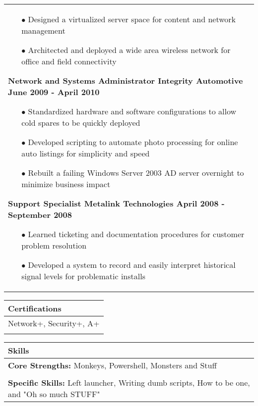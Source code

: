 \documentclass{article}
\begin{document}
\begin{tabular}{p{\dimexpr\linewidth-2\tabcolsep}}
 \begin{itemize}
	\item[$\bullet$]Designed a virtualized server space for content and network management
	\item[$\bullet$]Architected and deployed a wide area wireless network for office and field connectivity
  \end{itemize}
  {\bfseries Network and Systems Administrator \qquad Integrity Automotive \hfill June 2009 - April 2010}
 \begin{itemize}
	\item[$\bullet$]Standardized hardware and software configurations to allow cold spares to be quickly deployed
	\item[$\bullet$]Developed scripting to automate photo processing for online auto listings for simplicity and speed
	\item[$\bullet$]Rebuilt a failing Windows Server 2003 AD server overnight to minimize business impact
 \end{itemize}
   {\bfseries Support Specialist \hfill Metalink Technologies \quad \qquad April 2008 - September 2008}
 \begin{itemize}
 	\item[$\bullet$]Learned ticketing and documentation procedures for customer problem resolution
 	\item[$\bullet$]Developed a system to record and easily interpret historical signal levels for problematic installs
 \end{itemize}
\end{tabular}
\begin{tabular}{p{\dimexpr\linewidth-2\tabcolsep}}
	\textbf{Certifications} \\
	\hline
	\textnormal{Network+, Security+, A+} \\
	\\
\end{tabular}
\begin{tabular}{p{\dimexpr\linewidth-2\tabcolsep}}
	\textbf{Skills} \\
	\hline
	\textbf{Core Strengths:} \textnormal{Monkeys, Powershell, Monsters and Stuff} \\
	\\
	\textbf{Specific Skills:} \textnormal{Left launcher, Writing dumb scripts, How to be one, and "Oh so much STUFF"}
\end{tabular}
\end{document}

